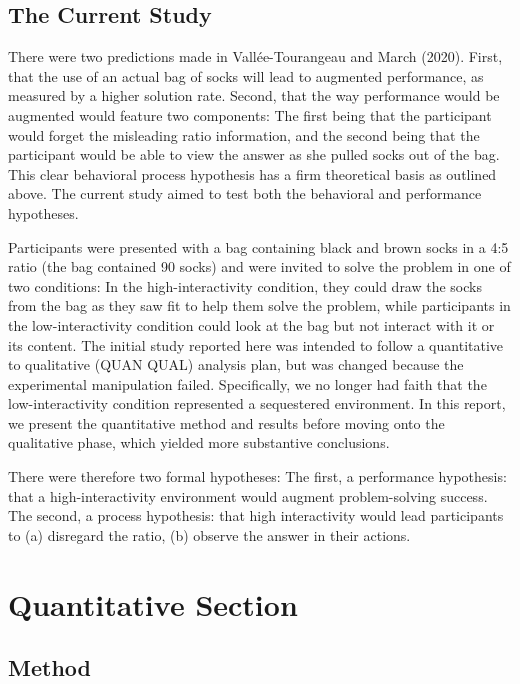 \documentclass{article}
\begin{document}
\subsection{The Current Study}

There were two predictions made in Vallée-Tourangeau and March (2020). First, that the use of an actual bag of socks will lead to augmented performance, as measured by a higher solution rate. Second, that the way performance would be augmented would feature two components: The first being that the participant would forget the misleading ratio information, and the second being that the participant would be able to view the answer as she pulled socks out of the bag. This clear behavioral process hypothesis has a firm theoretical basis as outlined above. The current study aimed to test both the behavioral and performance hypotheses. 

Participants were presented with a bag containing black and brown socks in a 4:5 ratio (the bag contained 90 socks) and were invited to solve the problem in one of two conditions: In the high-interactivity condition, they could draw the socks from the bag as they saw fit to help them solve the problem, while participants in the low-interactivity condition could look at the bag but not interact with it or its content. The initial study reported here was intended to follow a quantitative to qualitative (QUAN QUAL) analysis plan, but was changed because the experimental manipulation failed. Specifically, we no longer had faith that the low-interactivity condition represented a sequestered environment. In this report, we present the quantitative method and results before moving onto the qualitative phase, which yielded more substantive conclusions. 

There were therefore two formal hypotheses: The first, a performance hypothesis: that a high-interactivity environment would augment problem-solving success. The second, a process hypothesis: that high interactivity would lead participants to (a) disregard the ratio, (b) observe the answer in their actions.

\section{Quantitative Section}

\subsection{Method}
\end{document}
